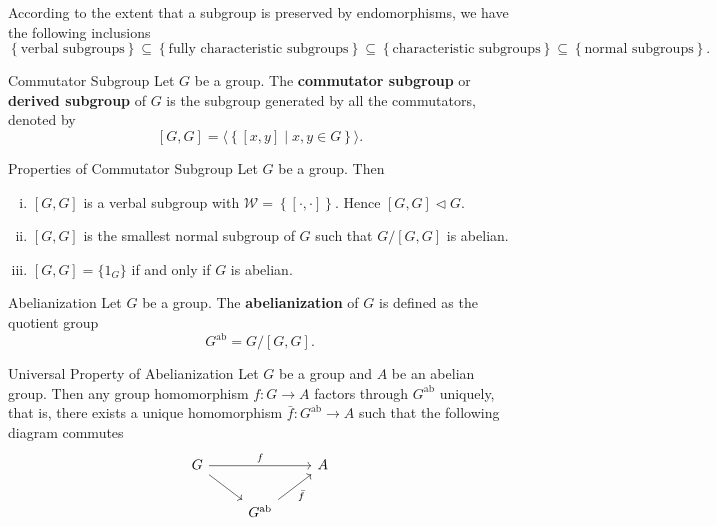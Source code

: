 \begin{proposition}{}{}
    According to the extent that a subgroup is preserved by endomorphisms, we have the following inclusions
    \[
        \left\{\text{verbal subgroups}\right\}\subseteq \left\{\text{fully characteristic subgroups}\right\}\subseteq \left\{\text{characteristic subgroups}\right\}\subseteq\left\{\text{normal subgroups}\right\}.
    \]
\end{proposition}


\begin{definition}{Commutator Subgroup}{}
    Let $G$ be a group. The \textbf{commutator subgroup} or \textbf{derived subgroup} of $G$ is the subgroup generated by all the commutators, denoted by
    $$
        [G,G]=\langle \left\{[x,y]\mid x,y\in G \right\}\rangle.
    $$
\end{definition}

\begin{proposition}{Properties of Commutator Subgroup}{}
    Let $G$ be a group. Then
    \begin{enumerate}[(i)]
        \item $[G,G]$ is a verbal subgroup with $\mathcal{W}=\left\{ [\cdot,\cdot] \right\}$. Hence $[G,G]\lhd G$.
        \item $[G,G]$ is the smallest normal subgroup of $G$ such that $G/[G,G]$ is abelian.
        \item $[G,G]=\{1_G\}$ if and only if $G$ is abelian.
    \end{enumerate}
\end{proposition}


\begin{definition}{Abelianization}{}
    Let $G$ be a group. The \textbf{abelianization} of $G$ is defined as the quotient group
    $$
        G^{\mathrm{ab}}=G/[G,G].
    $$
\end{definition}

\begin{proposition}{Universal Property of Abelianization}{}
    Let $G$ be a group and $A$ be an abelian group. Then any group homomorphism $f:G\to A$ factors through $G^{\mathrm{ab}}$ uniquely, that is, there exists a unique homomorphism $\bar{f}:G^{\mathrm{ab}}\to A$ such that the following diagram commutes
    $$
        \begin{tikzcd}[ampersand replacement=\&]
            G \arrow[rr, "f"] \arrow[rd] \&  \& A \\
            \& G^{\mathrm{ab}} \arrow[ru, "\bar{f}"'] \&
        \end{tikzcd}
    $$
\end{proposition}

